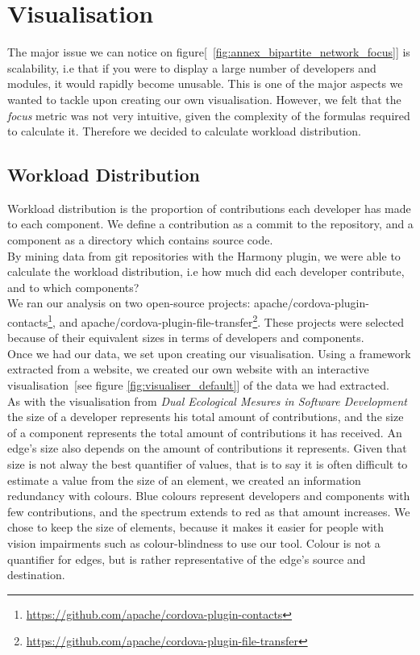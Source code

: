 \section{Visualisation}

The major issue we can notice on figure[~\ref{fig:annex_bipartite_network_focus}] is scalability, i.e that if you were to display a large number of developers and modules, it would rapidly become unusable. This is one of the major aspects we wanted to tackle upon creating our own visualisation.
However, we felt that the \emph{focus} metric was not very intuitive, given the complexity of the formulas required to calculate it. Therefore we decided to calculate workload distribution.

\subsection{Workload Distribution}

Workload distribution is the proportion of contributions each developer has made to each component.
We define a contribution as a commit to the repository, and a component as a directory which contains source code.\\

By mining data from git repositories with the Harmony\cite{Harmony} plugin, we were able to calculate the workload distribution, i.e how much did each developer contribute, and to which components?\\
We ran our analysis on two open-source projects: apache/cordova-plugin-contacts\footnote{\url{https://github.com/apache/cordova-plugin-contacts}}, and apache/cordova-plugin-file-transfer\footnote{\url{https://github.com/apache/cordova-plugin-file-transfer}}. These projects were selected because of their equivalent sizes in terms of developers and components.\\

Once we had our data, we set upon creating our visualisation. Using a framework extracted from a website\cite{peoplemov}, we created our own website with an interactive visualisation~[see figure \ref{fig:visualiser_default}] of the data we had extracted.\\[0.3cm]

As with the visualisation from \emph{Dual Ecological Mesures in Software Development}\cite{Posnett} the size of a developer represents his total amount of contributions, and the size of a component represents the total amount of contributions it has received. An edge's size also depends on the amount of contributions it represents.
Given that size is not alway the best quantifier of values, that is to say it is often difficult to estimate a value from the size of an element, we created an information redundancy with colours. Blue colours represent developers and components with few contributions, and the spectrum extends to red as that amount increases.
We chose to keep the size of elements, because it makes it easier for people with vision impairments such as colour-blindness to use our tool.
Colour is not a quantifier for edges, but is rather representative of the edge's source and destination.\\

